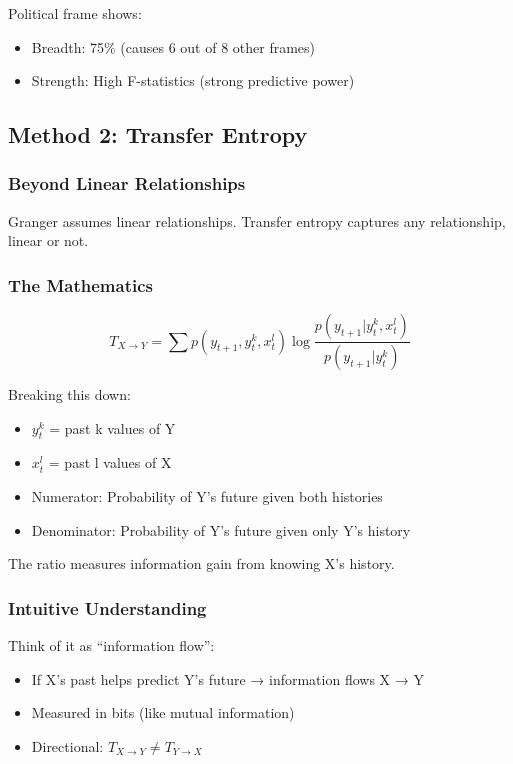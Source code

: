 \documentclass[11pt]{article}
\begin{document}
Political frame shows:
\begin{itemize}
    \item Breadth: 75\% (causes 6 out of 8 other frames)
    \item Strength: High F-statistics (strong predictive power)
\end{itemize}

\subsection{Method 2: Transfer Entropy}

\subsubsection{Beyond Linear Relationships}

Granger assumes linear relationships. Transfer entropy captures any relationship, linear or not.

\subsubsection{The Mathematics}

\begin{tcolorbox}[mybox={Transfer Entropy Formula}]
\[T_{X \to Y} = \sum p(y_{t+1}, y_t^k, x_t^l) \log \frac{p(y_{t+1}|y_t^k, x_t^l)}{p(y_{t+1}|y_t^k)}\]

Breaking this down:
\begin{itemize}
    \item $y_t^k$ = past k values of Y
    \item $x_t^l$ = past l values of X
    \item Numerator: Probability of Y's future given both histories
    \item Denominator: Probability of Y's future given only Y's history
\end{itemize}

The ratio measures information gain from knowing X's history.
\end{tcolorbox}

\subsubsection{Intuitive Understanding}

Think of it as ``information flow'':
\begin{itemize}
    \item If X's past helps predict Y's future → information flows X → Y
    \item Measured in bits (like mutual information)
    \item Directional: $T_{X \to Y} \neq T_{Y \to X}$
\end{itemize}
\end{document}
